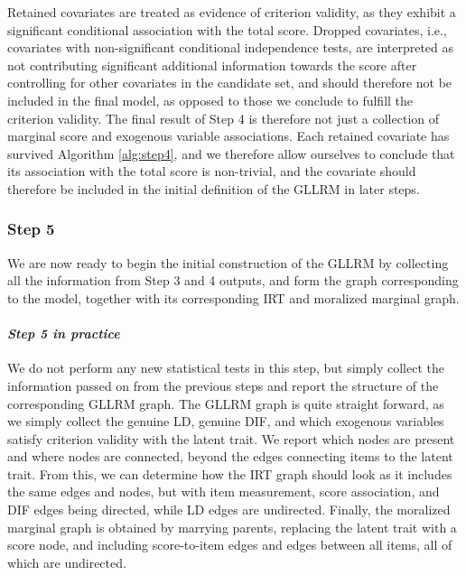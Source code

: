 \documentclass[a4project,12pt]{article}
\theoremstyle{examplestyle}
\theoremstyle{defstyle}
\theoremstyle{thmstyle}
\begin{document}
Retained covariates are treated as evidence of criterion validity, as they exhibit a significant conditional association with the total score. Dropped covariates, i.e., covariates with non-significant conditional independence tests, are interpreted as not contributing significant additional information towards the score after controlling for other covariates in the candidate set, and should therefore not be included in the final model, as opposed to those we conclude to fulfill the criterion validity. The final result of Step 4 is therefore not just a collection of marginal score and exogenous variable associations. Each retained covariate has survived Algorithm \ref{alg:step4}, and we therefore allow ourselves to conclude that its association with the total score is non-trivial, and the covariate should therefore be included in the initial definition of the GLLRM in later steps.




\subsubsection{Step 5}
We are now ready to begin the initial construction of the GLLRM by collecting all the information from Step 3 and 4 outputs, and form the graph corresponding to the model, together with its corresponding IRT and moralized marginal graph. 

\paragraph{\textit{Step 5 in practice}}
We do not perform any new statistical tests in this step, but simply collect the information passed on from the previous steps and report the structure of the corresponding GLLRM graph. The GLLRM graph is quite straight forward, as we simply collect the genuine LD, genuine DIF, and which exogenous variables satisfy criterion validity with the latent trait. We report which nodes are present and where nodes are connected, beyond the edges connecting items to the latent trait. From this, we can determine how the IRT graph should look as it includes the same edges and nodes, but with item measurement, score association, and DIF edges being directed, while LD edges are undirected. Finally, the moralized marginal graph is obtained by marrying parents, replacing the latent trait with a score node, and including score-to-item edges and edges between all items, all of which are undirected.  
\end{document}

